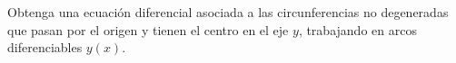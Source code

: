 Obtenga una ecuación diferencial asociada a las circunferencias no degeneradas que pasan por el origen y tienen el centro en el eje $y$, trabajando en arcos diferenciables $y(x)$.

